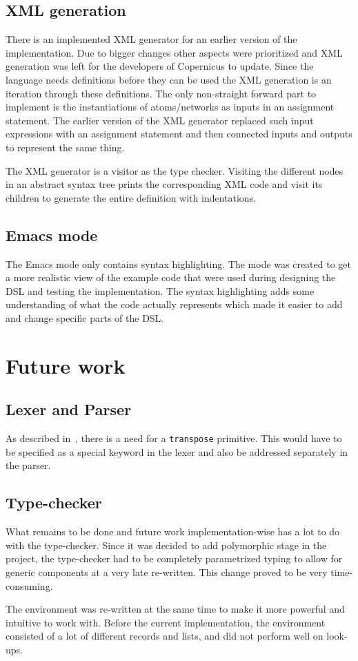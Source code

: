 \subsection{XML generation}\label{sec:xml}
There is an implemented XML generator for an earlier version of the
implementation. Due to bigger changes other aspects were prioritized
and XML generation was left for the developers of Copernicus to
update. Since the language needs definitions before they can be used
the XML generation is an iteration through these definitions. The only
non-straight forward part to implement is the instantiations of
atoms/networks as inputs in an assignment statement. The earlier
version of the XML generator replaced such input expressions with an
assignment statement and then connected inputs and outputs to
represent the same thing.

The XML generator is a visitor as the type checker. Visiting the
different nodes in an abstract syntax tree prints the corresponding
XML code and visit its children to generate the entire definition with
indentations.

\subsection{Emacs mode}\label{sec:emacs}
The Emacs mode only contains syntax highlighting. The mode was created
to get a more realistic view of the example code that were used during
designing the DSL and testing the implementation. The syntax
highlighting adds some understanding of what the code actually
represents which made it easier to add and change specific parts of
the DSL.

\section{Future work}

\subsection{Lexer and Parser}
As described in~, there is a need for a
\texttt{transpose} primitive. This would have to be specified as a
special keyword in the lexer and also be addressed separately in the
parser.


\subsection{Type-checker}
What remains to be done and future work implementation-wise has a lot
to do with the type-checker. Since it was decided to add polymorphic
stage in the project, the type-checker had to be completely
parametrized typing to allow for generic components at a very late
re-written. This change proved to be very time-consuming.

The environment was re-written at the same time to make it more
powerful and intuitive to work with. Before the current
implementation, the environment consisted of a lot of different
records and lists, and did not perform well on look-ups.
